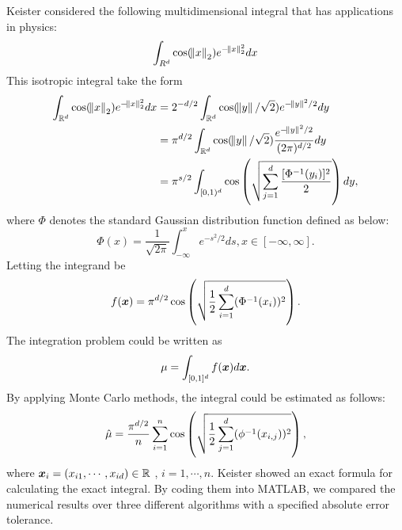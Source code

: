\documentclass{iitthesis}
\begin{document}
\label{subsec:keitertestfunmeanMCg}
Keister \cite{Keister96} considered the following multidimensional integral that has applications in physics:
\begin{equation}\label{KeisterTestFun}
\int_{R^d} \cos (\norm{x}_2)e^{-\norm{x}_2^2} dx 
\end{equation}
This isotropic integral take the form
\begin{align}
 \int_{\mathbb{R}^d} \cos (\norm{x}_2)e^{-\norm{x}_2^2} dx &= 2^{-d/2}\int_{\mathbb{R}^d} \cos(\norm{y}/\sqrt{2}) e^{-\norm{y}^2/2} dy \\
&= \pi^{d/2} \int_{\mathbb{R}^d} \cos(\norm{y}/\sqrt{2}) \frac{e^{-\norm{y}^2/2}}{(2\pi)^{d/2}} dy\\
 &= \pi^{s/2} \int_{[0,1)^d} \cos \left ( \sqrt{\sum_{j=1}^d \frac{[\Phi^{-1}(y_i)]^2}{2}}\right )dy,
\end{align}
where $\Phi$ denotes the standard Gaussian distribution function defined as below:
$$\Phi(x) = \frac{1}{\sqrt{2\pi}} \int_{-\infty}^x e^{-s^2/2}ds, x \in [-\infty, \infty].$$
Letting the integrand be 
\begin{equation}
f(\boldsymbol{x}) = \pi^{d/2} \cos \left( \sqrt{\frac{1}{2} \sum_{i=1}^d (\Phi^{-1} (x_i))^2}\right).
\end{equation}
The integration problem could be written as
\begin{equation}
\mu = \int_{[0,1]^d} f(\boldsymbol{x})d\boldsymbol{x}.
\end{equation}
By applying Monte Carlo methods, the integral could be estimated as follows:
\begin{align}
\hat{\mu} = \frac{\pi^{d/2}}{n}\sum_{i=1}^n \cos \left (\sqrt{\frac12 \sum_{j=1}^d (\phi^{-1}(x_{i,j}))^2}\right),
\end{align}
where $\boldsymbol{x}_i = (x_{i1},\cdots,x_{id}) \in \mathbb{R}$ , $i=1,\cdots, n.$
Keister \cite{Keister96} showed an exact formula for calculating the exact integral. By coding them into MATLAB, we compared the numerical results over three different algorithms with a specified absolute error tolerance.
\end{document}
